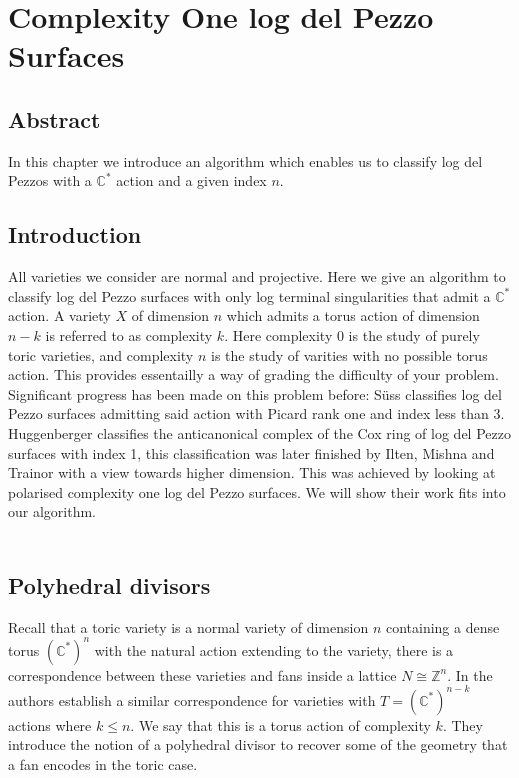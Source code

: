\documentclass[12pt,a4paper]{book}      %
\theoremstyle{definition}
\newcommand{\C}[1]{(\mathbb{C}^*)^#1}
\newcommand{\mb}[1]{\mathbb{#1}}
\begin{document}
\chapter{Complexity One log del Pezzo Surfaces}

\section{Abstract}

In this chapter we introduce an algorithm which enables us to classify log del Pezzos with a $\mb{C}^*$ action and a given index $n$.

\section{Introduction}

All varieties we consider are normal and projective. Here we give an algorithm to classify log del Pezzo surfaces  with only log terminal singularities that admit a $\mb{C}^*$ action. A variety $X$ of dimension $n$ which admits a torus action of dimension $n-k$ is referred to as complexity $k$. Here complexity 0 is the study of purely toric varieties, and complexity $n$ is the study of varities with no possible torus action. This provides essentailly a way of grading the difficulty of your problem. Significant progress has been made on this problem before: S\"{u}ss \cite{Suss} classifies log del Pezzo surfaces admitting said action with Picard rank one and index less than 3. Huggenberger \cite{Huggenberger} classifies the anticanonical complex of the Cox ring of log del Pezzo surfaces with index 1, this classification was later finished by Ilten, Mishna and Trainor \cite{IMT} with a view towards higher dimension. This was achieved by looking at polarised complexity one log del Pezzo surfaces. We will show their work fits into our algorithm. 
\\
\\
\section{Polyhedral divisors}
Recall that a toric variety is a  normal variety of dimension $n$ containing a dense torus $\C{n}$ with the natural action extending to the variety, there is a correspondence between these varieties and fans inside a lattice $N \cong \mathbb{Z}^n$.
In \cite{AltHau} the authors establish a similar correspondence for varieties with $T = \C{{ n-k}}$ actions where $k \leq n$. We say that this is a torus action of complexity $k$. They introduce the notion of a polyhedral divisor to recover some of the geometry that a fan encodes in the toric case. 
\end{document}
